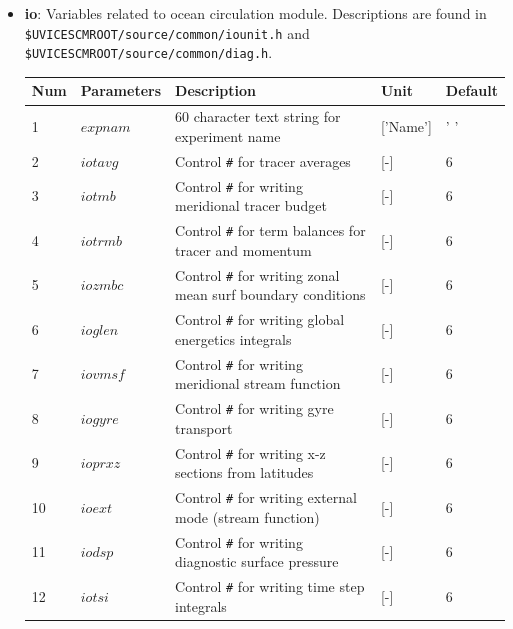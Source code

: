 \documentclass[a4paper]{article}
\begin{document}
\begin{itemize}
{\begin{longtable}{lllll}
    \end{longtable}}

\item \textbf{io}: Variables related to ocean circulation module. Descriptions are found in \\ \verb|$UVICESCMROOT/source/common/iounit.h| and \verb|$UVICESCMROOT/source/common/diag.h|.
{\footnotesize
\begin{longtable}{lllll} \hline
  Num  & Parameters  & Description                                                      & Unit                 & Default    \\ \hline 
  1    & $expnam$    & 60 character text string for experiment name                     & ['Name']             & ' '     \\
  2    & $iotavg$    & Control \verb|#| for tracer averages                             & [-]                  & 6       \\
  3    & $iotmb$     & Control \verb|#| for writing meridional tracer budget            & [-]                  & 6       \\
  4    & $iotrmb$    & Control \verb|#| for term balances for tracer and momentum       & [-]                  & 6    \\
  5    & $iozmbc$    & Control \verb|#| for writing zonal mean surf boundary conditions & [-]                  & 6    \\
  6    & $ioglen$    & Control \verb|#| for writing global energetics integrals         & [-]                  & 6    \\
  7    & $iovmsf$    & Control \verb|#| for writing meridional stream function          & [-]                  & 6          \\
  8    & $iogyre$    & Control \verb|#| for writing gyre transport                      & [-]                  & 6          \\
  9    & $ioprxz$    & Control \verb|#| for writing x-z sections from latitudes         & [-]                  & 6          \\
  10   & $ioext$     & Control \verb|#| for writing external mode (stream function)     & [-]                  & 6          \\
  11   & $iodsp$     & Control \verb|#| for writing diagnostic surface pressure         & [-]                  & 6          \\
  12   & $iotsi$     & Control \verb|#| for writing time step integrals                 & [-]                  & 6          \\

\end{longtable}}
\end{itemize}
\end{document}
